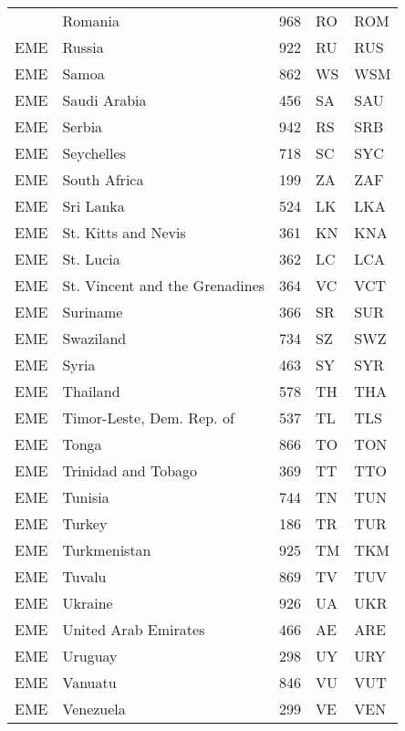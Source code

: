 \documentclass[12pt,a4paper]{article}
\begin{document}
\begin{ThreePartTable}
\begin{longtable}
{EME} & Romania & 968 & RO & ROM \\
{EME} & Russia & 922 & RU & RUS \\
{EME} & Samoa & 862 & WS & WSM \\
{EME} & Saudi Arabia & 456 & SA & SAU \\
{EME} & Serbia & 942 & RS & SRB \\
{EME} & Seychelles & 718 & SC & SYC \\
{EME} & South Africa & 199 & ZA & ZAF \\
{EME} & Sri Lanka & 524 & LK & LKA \\
{EME} & St. Kitts and Nevis & 361 & KN & KNA \\
{EME} & St. Lucia & 362 & LC & LCA \\
{EME} & St. Vincent and the Grenadines & 364 & VC & VCT \\
{EME} & Suriname & 366 & SR & SUR \\
{EME} & Swaziland & 734 & SZ & SWZ \\
{EME} & Syria & 463 & SY & SYR \\
{EME} & Thailand & 578 & TH & THA \\
{EME} & Timor-Leste, Dem. Rep. of & 537 & TL & TLS \\
{EME} & Tonga & 866 & TO & TON \\
{EME} & Trinidad and Tobago & 369 & TT & TTO \\
{EME} & Tunisia & 744 & TN & TUN \\
{EME} & Turkey & 186 & TR & TUR \\
{EME} & Turkmenistan & 925 & TM & TKM \\
{EME} & Tuvalu & 869 & TV & TUV \\
{EME} & Ukraine & 926 & UA & UKR \\
{EME} & United Arab Emirates & 466 & AE & ARE \\
{EME} & Uruguay & 298 & UY & URY \\
{EME} & Vanuatu & 846 & VU & VUT \\
{EME} & Venezuela & 299 & VE & VEN \\
    
  \end{longtable}
\end{ThreePartTable}
\end{document}
